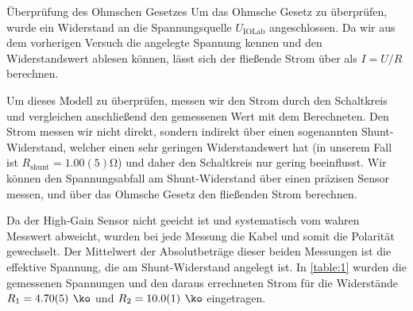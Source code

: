 \documentclass{alex_gp}
\begin{document}
\begin{mybox}{Überprüfung des Ohmschen Gesetzes}
	Um das Ohmsche Gesetz zu überprüfen, wurde ein Widerstand an die Spannungsquelle \( U_{\text{IOLab}} \) angeschlossen. Da wir aus dem vorherigen Versuch die angelegte Spannung kennen und den Widerstandswert ablesen können, lässt sich der fließende Strom über als \( I = U/R \) berechnen.
	
	Um dieses Modell zu überprüfen, messen wir den Strom durch den Schaltkreis und vergleichen anschließend den gemessenen Wert mit dem Berechneten. Den Strom messen wir nicht direkt, sondern indirekt über einen sogenannten Shunt-Widerstand, welcher einen sehr geringen Widerstandswert hat (in unserem Fall ist \( R_{\text{shunt}} = 1.00(5) \unit{\ohm} \)) und daher den Schaltkreis nur gering beeinflusst. Wir können den Spannungsabfall am Shunt-Widerstand über einen präzisen Sensor messen, und über das Ohmsche Gesetz den fließenden Strom berechnen. 
	
	Da der High-Gain Sensor nicht geeicht ist und systematisch vom wahren Messwert abweicht, wurden bei jede Messung die Kabel und somit die Polarität gewechselt. Der Mittelwert der Absolutbeträge dieser beiden Messungen ist die effektive Spannung, die am Shunt-Widerstand angelegt ist. In \autoref{table:1} wurden die gemessenen Spannungen und den daraus errechneten Strom für die Widerstände \( R_1 = 4.70(5) \unit{\ko} \) und \( R_2 = 10.0(1) \unit{\ko} \) eingetragen.
	

\end{mybox}
\end{document}

